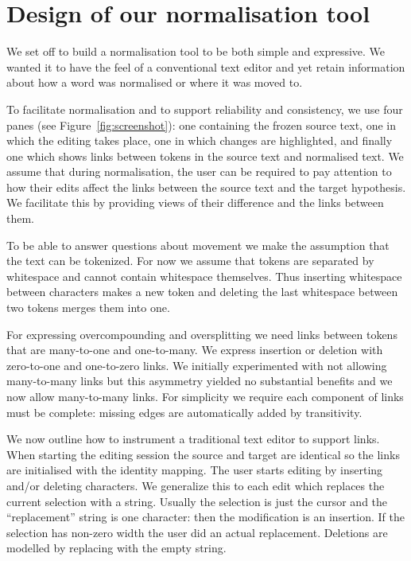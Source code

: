 \documentclass[10pt, a4paper]{article}
\begin{document}
\section{Design of our normalisation tool}
\label{sec:norm_tool}

We set off to build a normalisation tool to be both simple and expressive.
We wanted it to have the feel of a conventional text editor and yet retain
information about how a word was normalised or where it was moved to.

To facilitate normalisation and to support reliability and consistency,
we use four panes (see Figure~\ref{fig:screenshot}): one containing the
frozen source text, one in which the editing takes place, one in which
changes are highlighted, and finally one which shows links between tokens in the source text and normalised text.
We assume that during normalisation, the user can be required to pay attention
to how their edits affect the links between the source text and the target
hypothesis. We facilitate this by providing views of their difference and
the links between them.

To be
able to answer questions about movement we make the assumption that the text
can be tokenized. For now we assume that tokens are separated by whitespace
and cannot contain whitespace themselves. Thus inserting whitespace between
characters makes a new token and deleting the last whitespace between two
tokens merges them into one.

For expressing overcompounding and oversplitting we need links between tokens
that are many-to-one and one-to-many. We express insertion or deletion with
zero-to-one and one-to-zero links. We initially experimented with not allowing
many-to-many links but this asymmetry yielded no substantial benefits
and we now allow many-to-many links.
For simplicity we require each component
of links must be complete: missing edges are automatically added by
transitivity.

We now outline how to instrument a traditional text editor to support links.
When starting the editing session the source and target are identical so the
links are initialised with the identity mapping. The user starts editing
by inserting and/or deleting characters.
We generalize this to each edit which replaces the current selection with a
string. Usually the selection is just the cursor and the ``replacement'' string
is one character: then the modification is an insertion.
If the selection has non-zero width the user did an actual replacement.
Deletions are modelled by replacing with the empty string.
\end{document}
